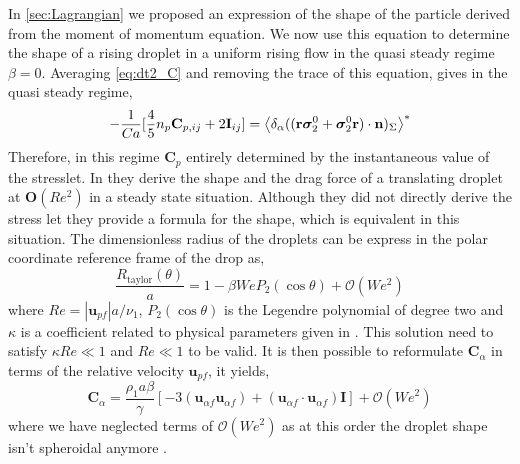 In \ref{sec:Lagrangian} we proposed an expression of the shape of the particle derived from the moment of momentum equation. 
We now use this equation to determine the shape of a rising droplet in a uniform rising flow in the quasi steady regime $\beta = 0$. 
Averaging \ref{eq:dt2_C} and removing the trace of this equation, gives in the quasi steady regime, 
\begin{equation} 
    - \frac{1}{Ca}
    [\frac{4}{5} n_p \textbf{C}_{p,ij} +2 \textbf{I}_{ij}]
    =  
    \left<\delta_\alpha ( (\textbf{r}\bm\sigma_2^0+ \bm\sigma_2^0\textbf{r})\cdot \textbf{n} )_{\Sigma}\right>^*
    \label{eq:Stresslet_quasi_steay}
\end{equation}
Therefore, in this regime $\textbf{C}_p$ entirely determined by the instantaneous value of the stresslet. 
In \citet{taylor1964deformation} they derive the shape and the drag force of a translating droplet at $\textbf{O}(Re^2)$ in a steady state situation. 
Although they did not directly derive the stress let they provide a formula for the shape, which is equivalent in this situation.  
The dimensionless radius of the droplets can be express in the polar coordinate reference frame of the drop as, 
\begin{equation*}
    \frac{R_\text{taylor}(\theta)}{a} = 1 - \beta \textit{We} P_2(\cos\theta)
    + \mathcal{O}(We^2)
    \label{eq:taylor_solution}
\end{equation*}
where $Re = |\textbf{u}_{pf}| a /\nu_1$, $P_2(\cos\theta)$ is the Legendre polynomial of degree two and $\kappa$ is a coefficient related to physical parameters given in \citet{taylor1964deformation}.  
This solution need to satisfy $\kappa Re \ll 1$ and $Re \ll 1$ to be valid. 
It is then possible to reformulate $\textbf{C}_\alpha$ in terms of the relative velocity $\textbf{u}_{pf}$, it yields, 
\begin{equation}
    \textbf{C}_\alpha =  \frac{ \rho_1 a \beta}{\gamma} \left[
        -  3
        (\textbf{u}_{\alpha f}\textbf{u}_{\alpha f})
        +   (\textbf{u}_{\alpha f}\cdot\textbf{u}_{\alpha f})\textbf{I}
    \right]
    + \mathcal{O}(\textit{We}^2)
\end{equation}
where we have neglected terms of $\mathcal{O}(\textit{We}^2)$ as at this order the droplet shape isn't spheroidal anymore \citet{taylor1964deformation}. 
